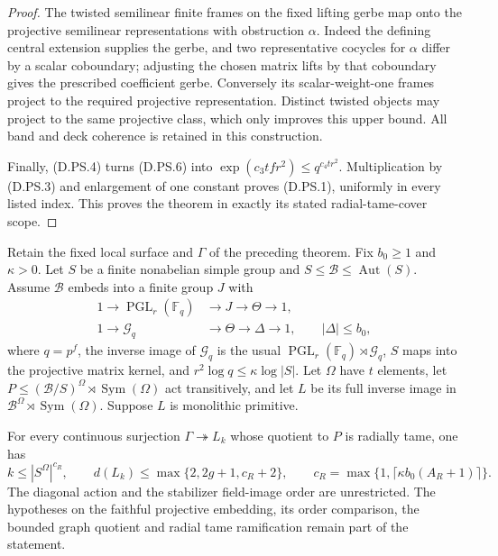 \begin{proof}
The twisted semilinear finite frames on the fixed lifting
gerbe map onto the projective semilinear representations
with obstruction $\alpha$. Indeed the defining central
extension supplies the gerbe, and two representative
cocycles for $\alpha$ differ by a scalar coboundary;
adjusting the chosen matrix lifts by that coboundary
gives the prescribed coefficient gerbe. Conversely its
scalar-weight-one frames project to the required
projective representation. Distinct twisted objects
may project to the same projective class, which only
improves this upper bound. All band and deck coherence
is retained in this construction.

Finally, (D.PS.4) turns (D.PS.6) into
$\exp(c_3tf r^2)\leq q^{c_4tr^2}$.
Multiplication by (D.PS.3) and enlargement of one
constant proves (D.PS.1), uniformly in every listed
index. This proves the theorem in exactly its stated
radial-tame-cover scope.
\end{proof}

\begin{corollary}
\label{D:tame-projective-automorphism-crowns}
Retain the fixed local surface and $\Gamma$ of the preceding
theorem. Fix $b_0\geq1$ and $\kappa>0$. Let $S$ be a finite
nonabelian simple group and $S\leq\mathcal B\leq\operatorname{Aut}(S)$.
Assume $\mathcal B$ embeds into a finite group $J$ with
\[
 \begin{split}
 1\longrightarrow\operatorname{PGL}_r(\mathbb F_q)
    &\longrightarrow J\longrightarrow\Theta\longrightarrow1,\\
 1\longrightarrow\mathcal G_q
    &\longrightarrow\Theta\longrightarrow\Delta\longrightarrow1,
                   \qquad |\Delta|\leq b_0,
 \end{split}                                           \tag{D.PS.7}
\]
where $q=p^f$, the inverse image of $\mathcal G_q$ is the
usual $\operatorname{PGL}_r(\mathbb F_q)\rtimes\mathcal G_q$,
$S$ maps into the projective matrix kernel, and
$r^2\log q\leq\kappa\log|S|$.
Let $\Omega$ have $t$ elements, let
$P\leq(\mathcal B/S)^\Omega\rtimes\operatorname{Sym}(\Omega)$
act transitively, and let $L$ be its full inverse image in
$\mathcal B^\Omega\rtimes\operatorname{Sym}(\Omega)$.
Suppose $L$ is monolithic primitive.

For every continuous surjection $\Gamma\twoheadrightarrow L_k$
whose quotient to $P$ is radially tame, one has
\[
 k\leq |S^\Omega|^{c_R},\qquad
 d(L_k)\leq\max\{2,2g+1,c_R+2\},\qquad
 c_R=\max\{1,\lceil\kappa b_0(A_R+1)\rceil\}.
                                                        \tag{D.PS.8}
\]
The diagonal action and the stabilizer field-image order
are unrestricted. The hypotheses on the faithful projective
embedding, its order comparison, the bounded graph quotient
and radial tame ramification remain part of the statement.
\end{corollary}

